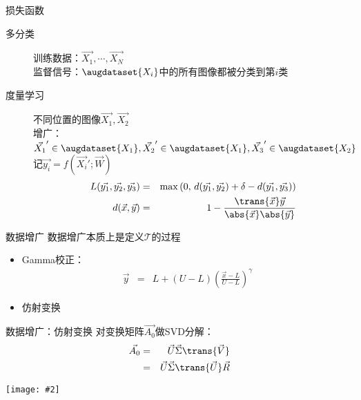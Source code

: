 \documentclass {beamer}
\newcommand{\addgraph}[2]{\begin{center}
\texttt{[image: \#2]}\end{center}}
\begin{document}
\begin{frame}{损失函数}
    \begin{description}
        \item[多分类]
            训练数据：$\vec{X_1},\cdots,\vec{X_N}$ \\
            监督信号：$\augdataset{X_i}$中的所有图像都被分类到第$i$类 \\
            \pause
        \item[度量学习]
            不同位置的图像$\vec{X_1}, \vec{X_2}$ \\
            增广： $\vec{X_1}' \in \augdataset{X_1}, \vec{X_2}' \in \augdataset{X_1},
            \vec{X_3}' \in \augdataset{X_2}$ \\
            记$\vec{y_i}=f(\vec{X_i}';\vec{W})$
            \begin{eqnarray}
                L(\vec{y_1}, \vec{y_2}, \vec{y_3}) &=&
                    \max\left(0,\,
                        d(\vec{y_1}, \vec{y_2}) + \delta -
                        d(\vec{y_1}, \vec{y_3})
                    \right) \nonumber \\
                d(\vec{x}, \vec{y}) &=& 1 -
                    \frac{\trans{\vec{x}}\vec{y}}{\abs{\vec{x}}\abs{\vec{y}}}
                \label{eqn:cnn:mtrc:loss}
            \end{eqnarray}
    \end{description}
\end{frame}

\begin{frame}{数据增广}
    数据增广本质上是定义$\mathcal{T}$的过程

    \begin{itemize}
        \item Gamma校正：
            \begin{eqnarray}
                \vec{y} &=& L + (U-L)\left(\frac{\vec{x}-L}{U-L}\right)^\gamma
            \end{eqnarray}
        \item 仿射变换
    \end{itemize}
\end{frame}

\begin{frame}{数据增广：仿射变换}
    对变换矩阵$\vec{A_0}$做SVD分解：
    \begin{eqnarray}
        \vec{A_0} &=&  \vec{U}\vec{\Sigma}\trans{\vec{V}} \nonumber \\
            &=& \vec{U}\vec{\Sigma}\trans{\vec{U}}\vec{R}
    \end{eqnarray}
    \addgraph{0.75}{res/affine-eg.png}
\end{frame}
\end{document}
